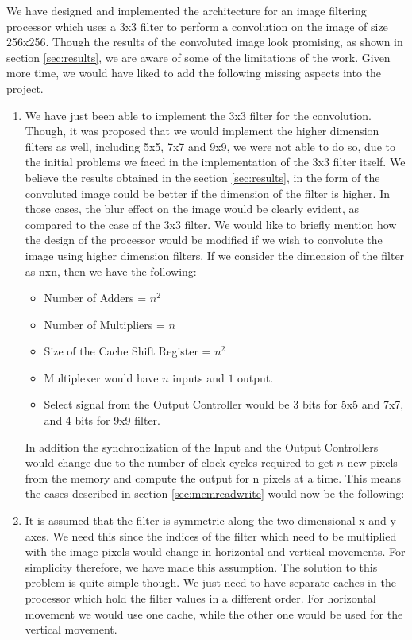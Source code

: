 \documentclass[11pt,a4paper]{article}
\begin{document}
We have designed and implemented the architecture for an image filtering processor which uses a 3x3 filter to perform a convolution on the image of size 256x256. Though the results of the convoluted image look promising, as shown in section \ref{sec:results}, we are aware of some of the limitations of the work. Given more time, we would have liked to add the following missing aspects into the project.

\begin{enumerate}
\item We have just been able to implement the 3x3 filter for the convolution. Though, it was proposed that we would implement the higher dimension filters as well, including 5x5, 7x7 and 9x9, we were not able to do so, due to the initial problems we faced in the implementation of the 3x3 filter itself. We believe the results obtained in the section \ref{sec:results}, in the form of the convoluted image could be better if the dimension of the filter is higher. In those cases, the blur effect on the image would be clearly evident, as compared to the case of the 3x3 filter. We would like to briefly mention how the design of the processor would be modified if we wish to convolute the image using higher dimension filters. If we consider the dimension of the filter as nxn, then we have the following:
	\begin{itemize}
		\item Number of Adders = $n^2$
		\item Number of Multipliers = $n$
		\item Size of the Cache Shift Register = $n^2$
		\item Multiplexer would have $n$ inputs and $1$ output.
		\item Select signal from the Output Controller would be 3 bits for 5x5 and 7x7, and 4 bits for 9x9 filter.
	\end{itemize}	
	
	In addition the synchronization of the Input and the Output Controllers would change due to the number of clock cycles required to get $n$ new pixels from the memory and compute the output for n pixels at a time. This means the cases described in section \ref{sec:memreadwrite} would now be the following:
	
	
\item It is assumed that the filter is symmetric along the two dimensional x and y axes. We need this since the indices of the filter which need to be multiplied with the image pixels would change in horizontal and vertical movements. For simplicity therefore, we have made this assumption.
The solution to this problem is quite simple though. We just need to have separate caches in the processor which hold the filter values in a different order. For horizontal movement we would use one cache, while the other one would be used for the vertical movement.


\end{enumerate}
\end{document}
